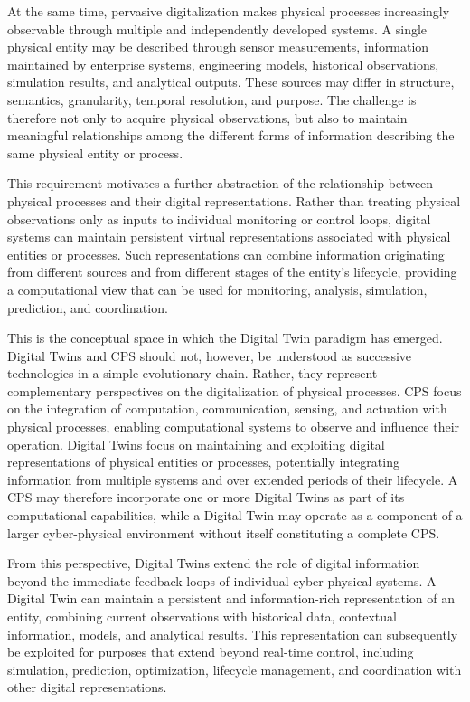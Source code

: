 At the same time, pervasive digitalization makes physical processes increasingly observable through multiple and independently developed systems. A single physical entity may be described through sensor measurements, information maintained by enterprise systems, engineering models, historical observations, simulation results, and analytical outputs. These sources may differ in structure, semantics, granularity, temporal resolution, and purpose. The challenge is therefore not only to acquire physical observations, but also to maintain meaningful relationships among the different forms of information describing the same physical entity or process.

This requirement motivates a further abstraction of the relationship between physical processes and their digital representations. Rather than treating physical observations only as inputs to individual monitoring or control loops, digital systems can maintain persistent virtual representations associated with physical entities or processes. Such representations can combine information originating from different sources and from different stages of the entity's lifecycle, providing a computational view that can be used for monitoring, analysis, simulation, prediction, and coordination.

This is the conceptual space in which the Digital Twin paradigm has emerged. Digital Twins and CPS should not, however, be understood as successive technologies in a simple evolutionary chain. Rather, they represent complementary perspectives on the digitalization of physical processes. CPS focus on the integration of computation, communication, sensing, and actuation with physical processes, enabling computational systems to observe and influence their operation. Digital Twins focus on maintaining and exploiting digital representations of physical entities or processes, potentially integrating information from multiple systems and over extended periods of their lifecycle. A CPS may therefore incorporate one or more Digital Twins as part of its computational capabilities, while a Digital Twin may operate as a component of a larger cyber-physical environment without itself constituting a complete CPS.

From this perspective, Digital Twins extend the role of digital information beyond the immediate feedback loops of individual cyber-physical systems. A Digital Twin can maintain a persistent and information-rich representation of an entity, combining current observations with historical data, contextual information, models, and analytical results. This representation can subsequently be exploited for purposes that extend beyond real-time control, including simulation, prediction, optimization, lifecycle management, and coordination with other digital representations.

